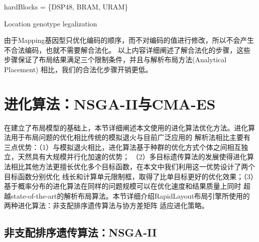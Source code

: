 \begin{algorithm}
	
	
	hardBlocks = \{DSP48, BRAM, URAM\}\;
	
	\caption{Location genotype legalization}	
	\label{algo:location}
\end{algorithm}

由于Mapping基因型只优化编码的顺序，而不对编码的值进行修改，所以不会产生不合法编码，也就不需要解合法化。
以上内容详细阐述了解合法化的步骤，这些步骤保证了布局结果满足三个限制条件，并且与解析布局方法(Analytical Placement)
相比，我们的合法化步骤开销更低。









\section{进化算法：NSGA-II与CMA-ES}

在建立了布局模型的基础上，本节详细阐述本文使用的进化算法优化方法。进化算法用于布局问题的优化相比传统的模拟退火与目前广泛应用的
解析法相比主要有三点优势：（1）与模拟退火相比，进化算法基于种群的优化方式个体之间相互独立，天然具有大规模并行化加速的优势；
（2）多目标遗传算法的发展使得进化算法相比其他方法更擅长优化多个目标函数，在本文中我们利用这一优势设计了两个目标函数分别优化
线长和计算单元限制框，取得了比单目标更好的优化效果；（3）基于概率分布的进化算法在同样的问题规模可以在优化速度和结果质量上同时
超越state-of-the-art的解析布局算法。本节详细介绍RapidLayout布局引擎所使用的两种进化算法：非支配排序遗传算法与协方差矩阵
适应进化策略。

\subsection{非支配排序遗传算法：NSGA-II}

